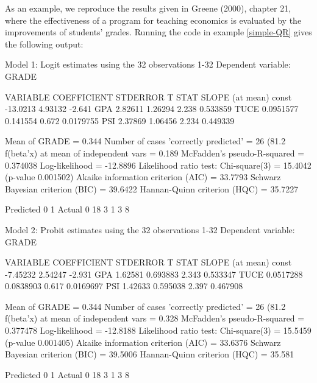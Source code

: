 As an example, we reproduce the results given in Greene (2000),
chapter 21, where the effectiveness of a program for teaching
economics is evaluated by the improvements of students' grades.
Running the code in example \ref{simple-QR} gives the following output:
\begin{code}

Model 1: Logit estimates using the 32 observations 1-32
Dependent variable: GRADE

      VARIABLE       COEFFICIENT        STDERROR      T STAT       SLOPE
                                                                  (at mean)
  const               -13.0213           4.93132      -2.641
  GPA                   2.82611          1.26294       2.238      0.533859   
  TUCE                  0.0951577        0.141554      0.672      0.0179755  
  PSI                   2.37869          1.06456       2.234      0.449339   

  Mean of GRADE = 0.344
  Number of cases 'correctly predicted' = 26 (81.2%
  f(beta'x) at mean of independent vars = 0.189
  McFadden's pseudo-R-squared = 0.374038
  Log-likelihood = -12.8896
  Likelihood ratio test: Chi-square(3) = 15.4042 (p-value 0.001502)
  Akaike information criterion (AIC) = 33.7793
  Schwarz Bayesian criterion (BIC) = 39.6422
  Hannan-Quinn criterion (HQC) = 35.7227

           Predicted
             0    1
  Actual 0  18    3
         1   3    8

Model 2: Probit estimates using the 32 observations 1-32
Dependent variable: GRADE

      VARIABLE       COEFFICIENT        STDERROR      T STAT       SLOPE
                                                                  (at mean)
  const                -7.45232          2.54247      -2.931
  GPA                   1.62581          0.693883      2.343      0.533347   
  TUCE                  0.0517288        0.0838903     0.617      0.0169697  
  PSI                   1.42633          0.595038      2.397      0.467908   

  Mean of GRADE = 0.344
  Number of cases 'correctly predicted' = 26 (81.2%
  f(beta'x) at mean of independent vars = 0.328
  McFadden's pseudo-R-squared = 0.377478
  Log-likelihood = -12.8188
  Likelihood ratio test: Chi-square(3) = 15.5459 (p-value 0.001405)
  Akaike information criterion (AIC) = 33.6376
  Schwarz Bayesian criterion (BIC) = 39.5006
  Hannan-Quinn criterion (HQC) = 35.581

           Predicted
             0    1
  Actual 0  18    3
         1   3    8

\end{code}

